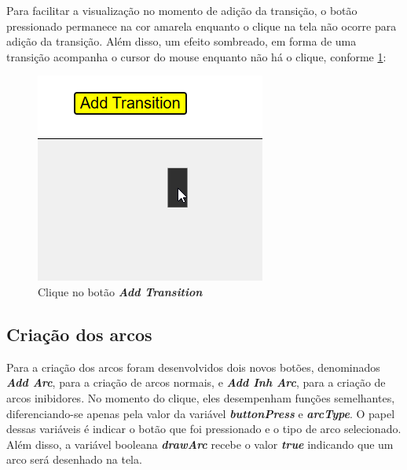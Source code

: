 \documentclass[
	12pt,				%
	openright,			%
	oneside,			%
	a4paper,			%
	english,			%
	brazil				%
	]{abntex2}
\begin{document}
Para facilitar a visualização no momento de adição da transição, o botão pressionado permanece na cor amarela enquanto o clique na tela não ocorre para adição da transição. Além disso, um efeito sombreado, em forma de uma transição acompanha o cursor do mouse enquanto não há o clique, conforme \ref{fig:clique_add_transition}: 

\begin{figure}[ht] 
	\centering
	\includegraphics[scale=0.55]{figuras/exemplo_clique_addTransition.png}
	\caption[Clicando bo botao addTransition]{Clique no botão \textit{\textbf{Add Transition}}}
	\label{fig:clique_add_transition}
\end{figure}

\subsection*{Criação dos arcos}

Para a criação dos arcos foram desenvolvidos dois novos botões, denominados \textbf{\textit{Add Arc}}, para a criação de arcos normais, e \textbf{\textit{Add Inh Arc}}, para a criação de arcos inibidores. No momento do clique, eles desempenham funções semelhantes, diferenciando-se apenas pela valor da variável \textit{\textbf{buttonPress}} e \textbf{\textit{arcType}}. O papel dessas variáveis é indicar o botão que foi pressionado e o tipo de arco selecionado. Além disso, a variável booleana \textbf{\textit{drawArc}} recebe o valor \textbf{\textit{true}} indicando que um arco será desenhado na tela.




\end{document}
